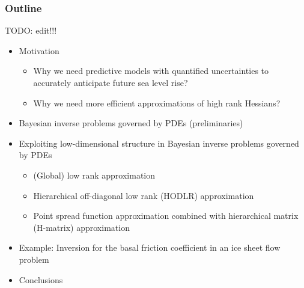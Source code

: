 \documentclass[10pt,final,xcolor=dvipsnames,aspect ratio=169]{beamer}
\begin{document}
\begin{frame}
	\frametitle{Outline}
	TODO: edit!!!
	
	\begin{itemize}
		\item Motivation
		\vspace{0.02in}
		\begin{itemize}
			\item Why we need predictive models with quantified uncertainties
			to accurately anticipate future sea level rise?
			\vspace{0.02in}
			\item Why we need more efficient approximations of high rank
			Hessians?
		\end{itemize}
		\vspace{0.02in}
		\item Bayesian inverse problems governed by PDEs (preliminaries)
		\vspace{0.02in}
		\item Exploiting low-dimensional structure in Bayesian inverse problems governed by PDEs
		\vspace{0.02in}
		\begin{itemize}
			\item (Global) low rank approximation
			\vspace{0.02in}
			\item Hierarchical off-diagonal low rank (HODLR) approximation
			\vspace{0.02in}
			\item Point spread function approximation combined with
			hierarchical matrix (H-matrix) approximation
		\end{itemize}
		\vspace{0.02in}
		\item Example: Inversion for the basal friction
		coefficient in an ice sheet flow problem
		\vspace{0.02in}
		\item Conclusions
	\end{itemize}
	
\end{frame}
\end{document}
